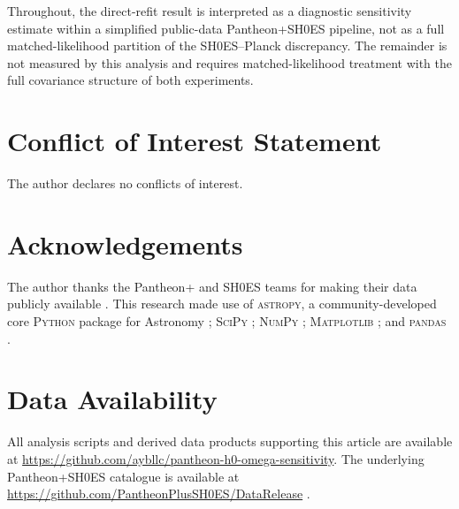 \documentclass[fleqn,usenatbib,useAMS]{mnras}
\begin{document}
Throughout, the direct-refit result is interpreted as a diagnostic
sensitivity estimate within a simplified public-data
Pantheon+SH0ES pipeline, not as a full matched-likelihood partition
of the SH0ES--Planck discrepancy.
The remainder is not measured by this analysis and requires
matched-likelihood treatment with the full covariance structure
of both experiments.

\section*{Conflict of Interest Statement}

The author declares no conflicts of interest.

\section*{Acknowledgements}

The author thanks the Pantheon+ and SH0ES teams for making their
data publicly available \citep{scolnic2022,brout2022,riess2022}.
This research made use of \textsc{astropy}, a community-developed
core \textsc{Python} package for Astronomy \citep{astropy2013,astropy2018,astropy2022};
\textsc{SciPy} \citep{scipy2020};
\textsc{NumPy} \citep{numpy2020};
\textsc{Matplotlib} \citep{matplotlib2007};
and \textsc{pandas} \citep{pandas2010}.

\section*{Data Availability}

All analysis scripts and derived data products supporting this
article are available at
\url{https://github.com/aybllc/pantheon-h0-omega-sensitivity}.
The underlying Pantheon+SH0ES catalogue is available at
\url{https://github.com/PantheonPlusSH0ES/DataRelease}
\citep{scolnic2022,brout2022}.





\bsp	%
\label{lastpage}

\end{document}
